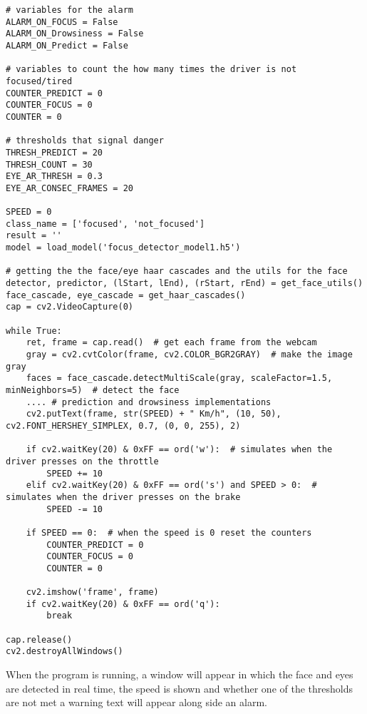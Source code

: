 \begin{lstlisting}
# variables for the alarm
ALARM_ON_FOCUS = False
ALARM_ON_Drowsiness = False
ALARM_ON_Predict = False

# variables to count the how many times the driver is not focused/tired
COUNTER_PREDICT = 0
COUNTER_FOCUS = 0
COUNTER = 0

# thresholds that signal danger
THRESH_PREDICT = 20
THRESH_COUNT = 30
EYE_AR_THRESH = 0.3
EYE_AR_CONSEC_FRAMES = 20

SPEED = 0
class_name = ['focused', 'not_focused']
result = ''
model = load_model('focus_detector_model1.h5')

# getting the the face/eye haar cascades and the utils for the face
detector, predictor, (lStart, lEnd), (rStart, rEnd) = get_face_utils()
face_cascade, eye_cascade = get_haar_cascades()
cap = cv2.VideoCapture(0)

while True:
    ret, frame = cap.read()  # get each frame from the webcam
    gray = cv2.cvtColor(frame, cv2.COLOR_BGR2GRAY)  # make the image gray
    faces = face_cascade.detectMultiScale(gray, scaleFactor=1.5, minNeighbors=5)  # detect the face
    .... # prediction and drowsiness implementations 
    cv2.putText(frame, str(SPEED) + " Km/h", (10, 50), cv2.FONT_HERSHEY_SIMPLEX, 0.7, (0, 0, 255), 2)

    if cv2.waitKey(20) & 0xFF == ord('w'):  # simulates when the driver presses on the throttle
        SPEED += 10
    elif cv2.waitKey(20) & 0xFF == ord('s') and SPEED > 0:  # simulates when the driver presses on the brake
        SPEED -= 10

    if SPEED == 0:  # when the speed is 0 reset the counters
        COUNTER_PREDICT = 0
        COUNTER_FOCUS = 0
        COUNTER = 0

    cv2.imshow('frame', frame)
    if cv2.waitKey(20) & 0xFF == ord('q'):
        break

cap.release()
cv2.destroyAllWindows()
\end{lstlisting}

When the program is running, a window will appear in which the face and eyes are detected in real time, the speed is shown and whether one of the thresholds are not met a warning text will appear along side an alarm. 